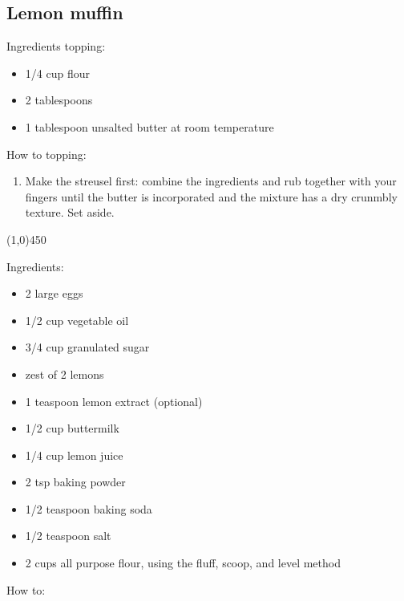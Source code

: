 \documentclass[a4paper, 12pt]{article}
\begin{document}
\newpage
\subsection{Lemon muffin}

Ingredients topping:

\begin{itemize}
	\item 1/4 cup flour
	\item 2 tablespoons
	\item 1 tablespoon unsalted butter at room temperature
\end{itemize}

How to topping:

\begin{enumerate}
	\item Make the streusel first: combine the ingredients and rub together with your fingers until the butter is incorporated and the mixture has a dry crunmbly texture. Set aside.
\end{enumerate}

\begin{center}
	\line(1,0){450}
\end{center}

Ingredients:

\begin{itemize}
	\item 2 large eggs
	\item 1/2 cup vegetable oil
	\item 3/4 cup granulated sugar
	\item zest of 2 lemons
	\item 1 teaspoon lemon extract (optional)
	\item 1/2 cup buttermilk
	\item 1/4 cup lemon juice
	\item 2 tsp baking powder
	\item 1/2 teaspoon baking soda
	\item 1/2 teaspoon salt
	\item 2 cups all purpose flour, using the fluff, scoop, and level method
\end{itemize}

How to:
\end{document}
